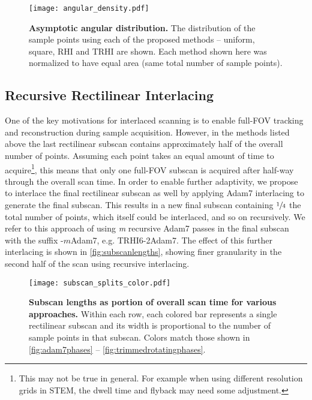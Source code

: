 \documentclass[aip, amsmath, amssymb, nobibnotes, nofootinbib, citeautoscript, reprint, superscriptaddress]{revtex4-2}
\begin{document}
    \begin{figure}
        \texttt{[image: angular\_density.pdf]}
        \caption{
        \label{fig:angdens} 
            \textbf{Asymptotic angular distribution.} The distribution of the sample points using each of the proposed methods -- uniform, square, RHI and TRHI are shown. Each method shown here was normalized to have equal area (same total number of sample points).
        }
    \end{figure}

    \subsection{\label{ssec:recursive}Recursive Rectilinear Interlacing}

    One of the key motivations for interlaced scanning is to enable full-FOV tracking and reconstruction during sample acquisition.
    However, in the methods listed above the last rectilinear subscan contains approximately half of the overall number of points.
    Assuming each point takes an equal amount of time to acquire\footnote{This may not be true in general. For example when using different resolution grids in STEM, the dwell time and flyback may need some adjustment.}, this means that only one full-FOV subscan is acquired after half-way through the overall scan time.
    In order to enable further adaptivity, we propose to interlace the final rectilinear subscan as well by applying Adam7 interlacing to generate the final subscan.
    This results in a new final subscan containing $\sfrac{1}{4}$ the total number of points, which itself could be interlaced, and so on recursively.
    We refer to this approach of using \textit{m} recursive Adam7 passes in the final subscan with the suffix -$\mathit{m}$Adam7, e.g. TRHI6-2Adam7.
    The effect of this further interlacing is shown in \autoref{fig:subscanlengths}, showing finer granularity in the second half of the scan using recursive interlacing.

    \begin{figure}
        \texttt{[image: subscan\_splits\_color.pdf]}
        \caption{
            \label{fig:subscanlengths} 
            \textbf{Subscan lengths as portion of overall scan time for various approaches.} 
            Within each row, each colored bar represents a single rectilinear subscan and its width is proportional to the number of sample points in that subscan. 
            Colors match those shown in \autoref{fig:adam7phases} -- \autoref{fig:trimmedrotatingphases}.
            }
    \end{figure}
\end{document}
